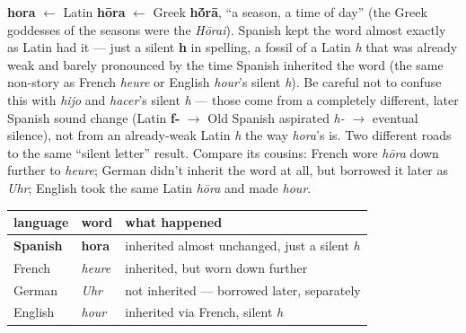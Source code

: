 \begin{cousinweb}
\textbf{hora} $\leftarrow$ Latin \textbf{hōra} $\leftarrow$ Greek \textbf{h\'{\={o}}rā}, \textquotedblleft{}a season, a time of day\textquotedblright{} (the Greek goddesses of the seasons were the \emph{Hōrai}). Spanish kept the word almost exactly as Latin had it — just a silent \textbf{h} in spelling, a fossil of a Latin \emph{h} that was already weak and barely pronounced by the time Spanish inherited the word (the same non-story as French \emph{heure} or English \emph{hour}'s silent \emph{h}). Be careful not to confuse this with \emph{hijo} and \emph{hacer}'s silent \emph{h} — those come from a completely different, later Spanish sound change (Latin \textbf{f-} $\to$ Old Spanish aspirated \emph{h-} $\to$ eventual silence), not from an already-weak Latin \emph{h} the way \emph{hora}'s is. Two different roads to the same \textquotedblleft{}silent letter\textquotedblright{} result. Compare its cousins: French wore \emph{hōra} down further to \emph{heure}; German didn't inherit the word at all, but borrowed it later as \emph{Uhr}; English took the same Latin \emph{hōra} and made \emph{hour}.

\noindent
\begin{tabularx}{\linewidth}{@{}>{\raggedright\arraybackslash}X>{\raggedright\arraybackslash}X>{\raggedright\arraybackslash}X@{}}
\toprule
\textbf{language} & \textbf{word} & \textbf{what happened} \\
\midrule
\textbf{Spanish} & \textbf{hora} & inherited almost unchanged, just a silent \emph{h} \\
French & \emph{heure} & inherited, but worn down further \\
German & \emph{Uhr} & not inherited — borrowed later, separately \\
English & \emph{hour} & inherited via French, silent \emph{h} \\
\bottomrule
\end{tabularx}
\end{cousinweb}


